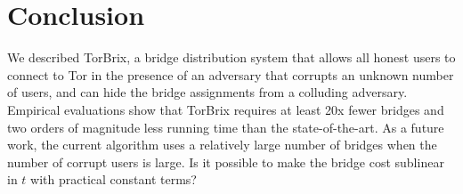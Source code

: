 \documentclass[letterpaper,twocolumn,10pt]{article}
\newcommand{\jared}[1]{}
\newcommand{\sfsize}{\fontsize{0.73\baselineskip}{0.73\baselineskip}\selectfont}
\newcommand{\sans}[1]{\textsf{\sfsize \mbox{#1}}}
\newcommand{\brix}{\sans{TorBrix}\xspace}
\begin{document}

\vspace{-0.75em}
\section{Conclusion} \label{sec:conclusion}
We described \brix, a bridge distribution system that allows all honest users to connect to Tor in the presence of an adversary that corrupts an unknown number of users, %
and can hide the bridge assignments from a colluding adversary. %
Empirical evaluations show that \brix requires at least 20x fewer bridges and two orders of magnitude less running time than the state-of-the-art.
%
As a future work, the current algorithm uses a relatively large number of bridges when the number of corrupt users is large. Is it possible to make the bridge cost sublinear in $t$ with practical constant terms? 
%
\end{document}
